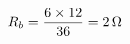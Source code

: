 \documentclass[preview]{standalone}
\begin{document}
\begin{align*}
\special{dvisvgm:raw <g id='unique000'>}R_b = \frac{6 \times 12}{36} = 2\,\Omega\special{dvisvgm:raw </g>}
\end{align*}
\end{document}
